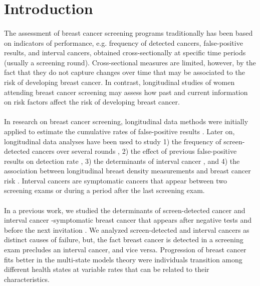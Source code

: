 \section{Introduction}

\paragraph{}The assessment of breast cancer screening programs traditionally has been based on indicators of performance, e.g. frequency of detected cancers, false-positive results, and interval cancers, obtained cross-sectionally at specific time periods (usually a screening round). Cross-sectional measures are limited, however, by the fact that they do not capture changes over time that may be associated to the risk of developing breast cancer. In contrast, longitudinal studies of women attending breast cancer screening may assess how past and current information on risk factors affect the risk of developing breast cancer.

\paragraph{}In research on breast cancer screening, longitudinal data methods were initially applied to estimate the cumulative rates of false-positive results \cite{Elmore1998, Castells2006, Hubbard2011, Roman2011b, Hofvind2012d}. Later on, longitudinal data analyses have been used to study 1) the frequency of screen-detected cancers over several rounds \cite{Hofvind2006, Blanch2013}, 2) the effect of previous false-positive results on detection rate \cite{VonEuler-Chelpin2012, Castells2013b}, 3) the determinants of interval cancer \cite{Hofvind2006, Blanch2014}, and 4) the association between longitudinal breast density measurements and breast cancer risk \cite{Armero2016}.
Interval cancers are symptomatic cancers that appear between two screening exams or during a period after the last screening exam.

\paragraph{}In a previous work, we studied the determinants of screen-detected cancer and interval cancer  -symptomatic breast cancer that appears after negative tests and before the next invitation \cite{Blanch2014}. We analyzed screen-detected and interval cancers as distinct causes of failure, but, the fact breast cancer is detected in a screening exam precludes an interval cancer, and vice versa. Progression of breast cancer fits better in the multi-state models theory were individuals transition among different health states at variable rates that can be related to their characteristics. 

